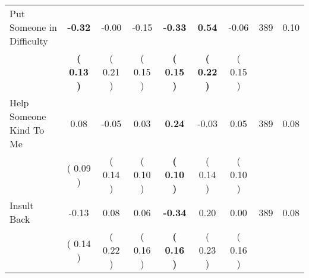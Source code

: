 \begin{tabular}{lcccccccc}
Put Someone in Difficulty & \textbf{    -0.32} &     -0.00 &     -0.15 & \textbf{    -0.33} & \textbf{     0.54} &     -0.06 & 389 &       0.10 \\ 
 & \textbf{(     0.13 )} & (     0.21 ) & (     0.15 ) & \textbf{(     0.15 )} & \textbf{(     0.22 )} & (     0.15 ) & \\
Help Someone Kind To Me &      0.08 &     -0.05 &      0.03 & \textbf{     0.24} &     -0.03 &      0.05 & 389 &       0.08 \\ 
 & (     0.09 ) & (     0.14 ) & (     0.10 ) & \textbf{(     0.10 )} & (     0.14 ) & (     0.10 ) & \\
Insult Back &     -0.13 &      0.08 &      0.06 & \textbf{    -0.34} &      0.20 &      0.00 & 389 &       0.08 \\ 
 & (     0.14 ) & (     0.22 ) & (     0.16 ) & \textbf{(     0.16 )} & (     0.23 ) & (     0.16 ) & \\
\bottomrule
\end{tabular}
